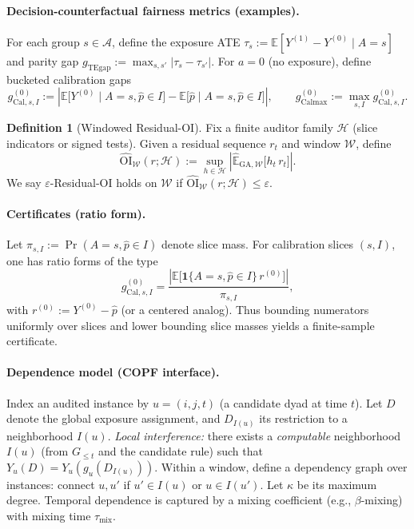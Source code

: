 \documentclass[11pt]{article}
\newcommand{\E}{\mathbb{E}}
\newcommand{\1}{\mathbf{1}}
\newcommand{\cA}{\mathcal{A}}
\newcommand{\cH}{\mathcal{H}}
\newcommand{\cW}{\mathcal{W}}
\newcommand{\abs}[1]{\left|#1\right|}
\newcommand{\Eb}{\widehat{\mathbb{E}}} %
\theoremstyle{plain}
\theoremstyle{definition}
\newtheorem{definition}[theorem]{Definition}
\theoremstyle{remark}
\begin{document}
\paragraph{Decision-counterfactual fairness metrics (examples).}
For each group $s\in\cA$, define the exposure ATE $\tau_s := \E[Y^{(1)}-Y^{(0)}\mid A=s]$ and parity gap
$g_{\mathrm{TEgap}} := \max_{s,s'}|\tau_s-\tau_{s'}|$.
For $a=0$ (no exposure), define bucketed calibration gaps
\[
g_{\mathrm{Cal},s,I}^{(0)}
:=\abs{\E\bigl[Y^{(0)}\mid A=s,\hat p\in I\bigr]-\E\bigl[\hat p\mid A=s,\hat p\in I\bigr]},
\qquad
g_{\mathrm{Calmax}}^{(0)}:=\max_{s,I} g_{\mathrm{Cal},s,I}^{(0)}.
\]

\begin{definition}[Windowed Residual-OI]\label{def:residualoi}
Fix a finite auditor family $\cH$ (slice indicators or signed tests).
Given a residual sequence $r_t$ and window $\cW$, define
\[
\widehat{\mathrm{OI}}_{\cW}(r;\cH)
:=\sup_{h\in\cH}\abs{\Eb_{\mathrm{GA},\cW}\bigl[h_t\,r_t\bigr]}.
\]
We say $\varepsilon$-Residual-OI holds on $\cW$ if $\widehat{\mathrm{OI}}_{\cW}(r;\cH)\le \varepsilon$.
\end{definition}

\paragraph{Certificates (ratio form).}
Let $\pi_{s,I}:=\Pr(A=s,\hat p\in I)$ denote slice mass.
For calibration slices $(s,I)$, one has ratio forms of the type
\[
g_{\mathrm{Cal},s,I}^{(0)}
=\frac{\abs{\E\bigl[\1\{A=s,\hat p\in I\}\,r^{(0)}\bigr]}}{\pi_{s,I}},
\]
with $r^{(0)}:=Y^{(0)}-\hat p$ (or a centered analog).
Thus bounding numerators uniformly over slices and lower bounding slice masses yields a finite-sample certificate.

\paragraph{Dependence model (COPF interface).}
Index an audited instance by $u=(i,j,t)$ (a candidate dyad at time $t$).
Let $D$ denote the global exposure assignment, and $D_{I(u)}$ its restriction to a neighborhood $I(u)$.
\emph{Local interference:} there exists a \emph{computable} neighborhood $I(u)$ (from $G_{\le t}$ and the candidate rule)
such that $Y_u(D)=Y_u(g_u(D_{I(u)}))$.
Within a window, define a dependency graph over instances: connect $u,u'$ if $u'\in I(u)$ or $u\in I(u')$.
Let $\kappa$ be its maximum degree.
Temporal dependence is captured by a mixing coefficient (e.g., $\beta$-mixing) with mixing time $\tau_{\mathrm{mix}}$.
\end{document}
